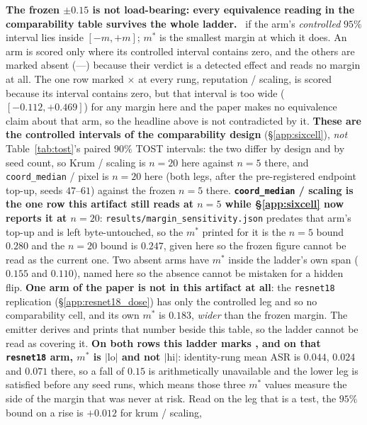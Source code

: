 \documentclass{article}
\begin{document}
\begin{table}[h]
\centering\small\setlength{\tabcolsep}{5pt}
\caption{\textbf{The frozen $\pm0.15$ is not load-bearing: every equivalence reading in the comparability
table survives the whole ladder.} \checkmark\ if the arm's \emph{controlled} $95\%$ interval lies inside
$[-m,+m]$; $m^\ast$ is the smallest margin at which it does. An arm is scored only where its
controlled interval contains zero, and the others are marked absent
(---) because their verdict is a detected effect and reads no margin at all. The one row marked
$\times$ at every rung, reputation / scaling, is scored because its interval contains zero, but that
interval is too wide ($[-0.112,+0.469]$) for any margin here and the paper makes no equivalence claim
about that arm, so the headline above is not contradicted by it. \textbf{These are the
controlled intervals of the comparability design} (§\ref{app:sixcell}), \emph{not}
Table~\ref{tab:tost}'s paired $90\%$ TOST intervals: the two differ by design and by seed count, so
Krum / scaling is $n{=}20$ here against $n{=}5$ there, and \texttt{coord\_median} / pixel is $n{=}20$
here (both legs, after the pre-registered endpoint top-up, seeds $47$--$61$) against the frozen $n{=}5$ there. \textbf{\texttt{coord\_median} / scaling is the one row this artifact still reads at $n{=}5$ while §\ref{app:sixcell} now reports it at $n{=}20$}: \texttt{results/\allowbreak margin\_\allowbreak sensitivity.json} predates that arm's top-up and is left byte-untouched, so the $m^\ast$ printed for it is the $n{=}5$ bound $0.280$ and the $n{=}20$ bound is $0.247$, given here so the frozen figure cannot be read as the current one. Two absent arms
have $m^\ast$ inside the ladder's
own span ($0.155$ and $0.110$), named here so the absence cannot be mistaken for a hidden flip.
\textbf{One arm of the paper is not in this artifact at all}: the \texttt{resnet18} replication
(§\ref{app:resnet18_dose}) has only the controlled leg and so no comparability cell, and its own
$m^\ast$ is $0.183$, \emph{wider} than the frozen margin. The emitter derives and prints that number
beside this table, so the ladder cannot be read as covering it. \textbf{On both rows this ladder marks \checkmark, and on that
\texttt{resnet18} arm, $m^{\ast}$ is $|\mathrm{lo}|$ and not $|\mathrm{hi}|$}: identity-rung mean ASR is
$0.044$, $0.024$ and $0.071$ there, so a fall of $0.15$ is arithmetically unavailable and the lower leg is
satisfied before any seed runs, which means those three $m^{\ast}$ values measure the side of the margin that
was never at risk. Read on the leg that is a test, the $95\%$ bound on a rise is $+0.012$ for krum / scaling,
}
\end{table}
\end{document}
